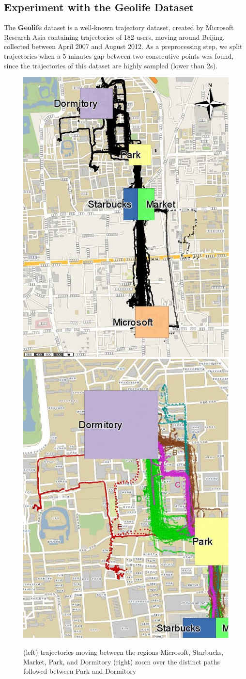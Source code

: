 \documentclass[12pt]{article}
\begin{document}
\subsection{Experiment with the Geolife Dataset}\label{sec:geolife}

The \textbf{Geolife} dataset is a well-known trajectory dataset, created by Microsoft Research Asia \citep{zheng2009mining} containing trajectories of 182 users, moving around Beijing, collected between April 2007 and August 2012. As a preprocessing step, we split trajectories when a 5 minutes gap between two consecutive points was found, since the trajectories of this dataset are highly sampled (lower than 2s).

\begin{figure}[ht!]
\centering
\centerline{
\includegraphics[width=.5\textwidth]{Images/Geolife-Trajectories-painted}
\includegraphics[width=.5\textwidth]{Images/Geolife-Paths-painted}
}
\caption{(left) trajectories moving between the regions Microsoft, Starbucks, Market, Park, and Dormitory (right) zoom over the distinct paths followed between Park and Dormitory}
\label{fig:geolife_map_rois}
\end{figure}
\end{document}
